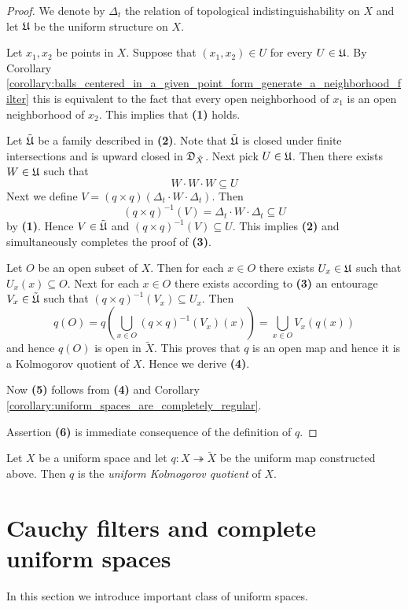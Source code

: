 \documentclass[10pt]{amsart}
\begin{document}
\begin{proof}
	We denote by $\Delta_t$ the relation of topological indistinguishability on $X$ and let ${\mathfrak U}$ be the uniform structure on $X$.

	Let $x_1, x_2$ be points in $X$. Suppose that $(x_1, x_2) \in U$ for every $U \in {\mathfrak U}$. By Corollary \ref{corollary:balls_centered_in_a_given_point_form_generate_a_neighborhood_filter} this is equivalent to the fact that every open neighborhood of $x_1$ is an open neighborhood of $x_2$. This implies that \textbf{(1)} holds.

	Let $\tilde{{\mathfrak U}}$ be a family described in \textbf{(2)}. Note that $\tilde{{\mathfrak U}}$ is closed under finite intersections and is upward closed in ${\mathfrak D}_{\tilde{X}}$. Next pick $U \in {\mathfrak U}$. Then there exists $W \in {\mathfrak U}$ such that
	$$W\cdot W \cdot W \subseteq U$$
	Next we define $V = \left(q\times q\right)\left(\Delta_t\cdot W\cdot \Delta_t\right)$. Then
	$$\left(q\times q\right)^{-1}(V) = \Delta_t\cdot W\cdot \Delta_t \subseteq U$$
	by \textbf{(1)}. Hence $V \in \tilde{{\mathfrak U}}$ and $\left(q\times q\right)^{-1}(V)\subseteq U$. This implies \textbf{(2)} and simultaneously completes the proof of \textbf{(3)}.

	Let $O$ be an open subset of $X$. Then for each $x \in O$ there exists $U_x \in {\mathfrak U}$ such that $U_x(x)\subseteq O$. Next for each $x \in O$ there exists according to \textbf{(3)} an entourage $V_x \in \tilde{{\mathfrak U}}$ such that $\left(q\times q\right)^{-1}(V_x) \subseteq U_x$. Then
	$$q(O) = q\left(\bigcup_{x\in O}\left(q\times q\right)^{-1}(V_x)(x)\right) = \bigcup_{x \in O}V_x\left(q(x)\right)$$
	and hence $q(O)$ is open in $\tilde{X}$. This proves that $q$ is an open map and hence it is a Kolmogorov quotient of $X$. Hence we derive \textbf{(4)}.

	Now \textbf{(5)} follows from \textbf{(4)} and Corollary \ref{corollary:uniform_spaces_are_completely_regular}.

	Assertion \textbf{(6)} is immediate consequence of the definition of $q$.
\end{proof}

\begin{definition}
	Let $X$ be a uniform space and let $q:X\twoheadrightarrow \tilde{X}$ be the uniform map constructed above. Then $q$ is the \textit{uniform Kolmogorov quotient} of $X$.
\end{definition}

\section{Cauchy filters and complete uniform spaces}
\noindent
In this section we introduce important class of uniform spaces.
\end{document}
